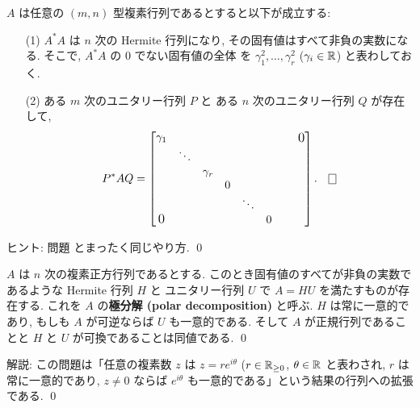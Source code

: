 \documentclass[12pt,twoside]{jarticle}
\begin{document}

\begin{question}
\label{q:complex-PAQ}
  $A$ は任意の $(m,n)$ 型複素行列であるとすると以下が成立する:
  \begin{enumerate}
  \item[(1)] $A^*A$ は $n$ 次の Hermite 行列になり, 
    その固有値はすべて非負の実数になる.
    そこで, $A^*A$ の $0$ でない固有値の全体
    を $\gamma_1^2,\dots,\gamma_r^2$ ($\gamma_i\in{\mathbb R}$) と表わしておく.
  \item[(2)] ある $m$ 次のユニタリー行列 $P$ と
    ある $n$ 次のユニタリー行列 $Q$ が存在して, 
    \begin{equation*}
      P^*AQ = 
      \begin{bmatrix}
        \gamma_1  &        &          &   &        &   & \ & \bigzerou \\
                  & \ddots &          &   &        &   & & \\
                  &        & \gamma_r &   &        &   & & \\
                  &        &          & 0 &        &   & & \\
                  &        &          &   & \ddots &   & & \\
        \bigzerol &        &          &   &        & 0 & & \\
      \end{bmatrix}.
      \qed
    \end{equation*}
  \end{enumerate}
\end{question}

\noindent
ヒント: 問題  とまったく同じやり方.
\qed


\begin{question}[極分解]
  $A$ は $n$ 次の複素正方行列であるとする.
  このとき固有値のすべてが非負の実数であるような Hermite 行列 $H$ と
  ユニタリー行列 $U$ で $A=HU$ を満たすものが存在する.
  これを $A$ の{\bf 極分解 (polar decomposition)} と呼ぶ.
  $H$ は常に一意的であり, もしも $A$ が可逆ならば $U$ も一意的である.
  そして $A$ が正規行列であることと $H$ と $U$ が可換であることは同値である.
  \qed
\end{question}

\noindent
解説: この問題は「任意の複素数 $z$ は $z=re^{i\theta}$ ($r\in{\mathbb R}_{\ge0}$,
$\theta\in{\mathbb R}$ と表わされ, $r$ は常に一意的であり, 
$z\ne 0$ ならば $e^{i\theta}$ も一意的である」という結果の行列への拡張である.
\qed
\end{document}
